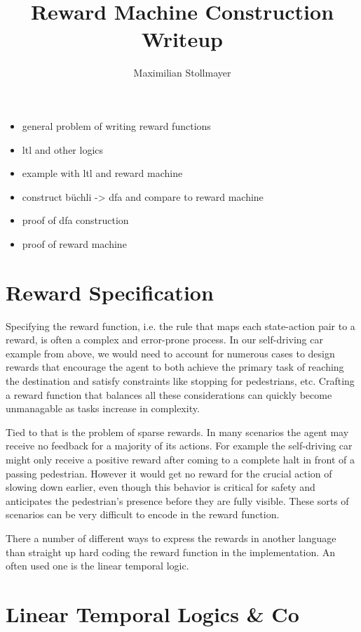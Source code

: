 \documentclass[12pt, a4paper]{article}
\title{Reward Machine Construction Writeup}
\author{Maximilian Stollmayer}
\date{}
\begin{document}
\maketitle

\begin{itemize}
	\item general problem of writing reward functions
	\item ltl and other logics
	\item example with ltl and reward machine
	\item construct büchli -> dfa and compare to reward machine
	\item proof of dfa construction
	\item proof of reward machine
\end{itemize}

\section*{Reward Specification}

Specifying the reward function, i.e. the rule that maps each state-action pair to a reward, is often a complex and error-prone process. In our self-driving car example from above, we would need to account for numerous cases to design rewards that encourage the agent to both achieve the primary task of reaching the destination and satisfy constraints like stopping for pedestrians, etc. Crafting a reward function that balances all these considerations can quickly become unmanagable as tasks increase in complexity.

Tied to that is the problem of sparse rewards. In many scenarios the agent may receive no feedback for a majority of its actions. For example the self-driving car might only receive a positive reward after coming to a complete halt in front of a passing pedestrian. However it would get no reward for the crucial action of slowing down earlier, even though this behavior is critical for safety and anticipates the pedestrian's presence before they are fully visible. These sorts of scenarios can be very difficult to encode in the reward function.

There a number of different ways to express the rewards in another language than straight up hard coding the reward function in the implementation. An often used one is the linear temporal logic.

\section*{Linear Temporal Logics \& Co}
\end{document}
